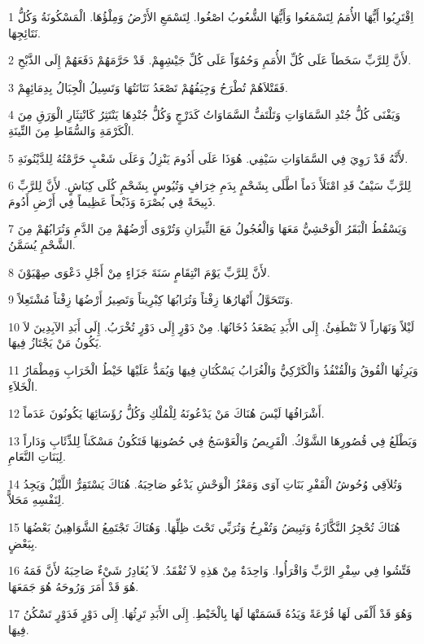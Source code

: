 \par 1 اِقْتَرِبُوا أَيُّهَا الأُمَمُ لِتَسْمَعُوا وَأَيُّهَا الشُّعُوبُ اصْغُوا. لِتَسْمَعِ الأَرْضُ وَمِلْؤُهَا. الْمَسْكُونَةُ وَكُلُّ نَتَائِجِهَا.
\par 2 لأَنَّ لِلرَّبِّ سَخَطاً عَلَى كُلِّ الأُمَمِ وَحُمُوّاً عَلَى كُلِّ جَيْشِهِمْ. قَدْ حَرَّمَهُمْ دَفَعَهُمْ إِلَى الذَّبْحِ.
\par 3 فَقَتْلاَهُمْ تُطْرَحُ وَجِيَفُهُمْ تَصْعَدُ نَتَانَتُهَا وَتَسِيلُ الْجِبَالُ بِدِمَائِهِمْ.
\par 4 وَيَفْنَى كُلُّ جُنْدِ السَّمَاوَاتِ وَتَلْتَفُّ السَّمَاوَاتُ كَدَرْجٍ وَكُلُّ جُنْدِهَا يَنْتَثِرُ كَانْتِثَارِ الْوَرَقِ مِنَ الْكَرْمَةِ وَالسُّقَاطِ مِنَ التِّينَةِ.
\par 5 لأَنَّهُ قَدْ رَوِيَ فِي السَّمَاوَاتِ سَيْفِي. هُوَذَا عَلَى أَدُومَ يَنْزِلُ وَعَلَى شَعْبٍ حَرَّمْتُهُ لِلدَّيْنُونَةِ.
\par 6 لِلرَّبِّ سَيْفٌ قَدِ امْتَلَأَ دَماً اطَّلَى بِشَحْمٍ بِدَمِ خِرَافٍ وَتُيُوسٍ بِشَحْمِ كُلَى كِبَاشٍ. لأَنَّ لِلرَّبِّ ذَبِيحَةً فِي بُصْرَةَ وَذَبْحاً عَظِيماً فِي أَرْضِ أَدُومَ.
\par 7 وَيَسْقُطُ الْبَقَرُ الْوَحْشِيُّ مَعَهَا وَالْعُجُولُ مَعَ الثِّيرَانِ وَتُرْوَى أَرْضُهُمْ مِنَ الدَّمِ وَتُرَابُهُمْ مِنَ الشَّحْمِ يُسَمَّنُ.
\par 8 لأَنَّ لِلرَّبِّ يَوْمَ انْتِقَامٍ سَنَةَ جَزَاءٍ مِنْ أَجْلِ دَعْوَى صِهْيَوْنَ.
\par 9 وَتَتَحَوَّلُ أَنْهَارُهَا زِفْتاً وَتُرَابُهَا كِبْرِيتاً وَتَصِيرُ أَرْضُهَا زِفْتاً مُشْتَعِلاً.
\par 10 لَيْلاً وَنَهَاراً لاَ تَنْطَفِئُ. إِلَى الأَبَدِ يَصْعَدُ دُخَانُهَا. مِنْ دَوْرٍ إِلَى دَوْرٍ تُخْرَبُ. إِلَى أَبَدِ الآبِدِينَ لاَ يَكُونُ مَنْ يَجْتَازُ فِيهَا.
\par 11 وَيَرِثُهَا الْقُوقُ وَالْقُنْفُذُ وَالْكَرْكِيُّ وَالْغُرَابُ يَسْكُنَانِ فِيهَا وَيُمَدُّ عَلَيْهَا خَيْطُ الْخَرَابِ وَمِطْمَارُ الْخَلاَءِ.
\par 12 أَشْرَافُهَا لَيْسَ هُنَاكَ مَنْ يَدْعُونَهُ لِلْمُلْكِ وَكُلُّ رُؤَسَائِهَا يَكُونُونَ عَدَماً.
\par 13 وَيَطْلَعُ فِي قُصُورِهَا الشَّوْكُ. الْقَرِيصُ وَالْعَوْسَجُ فِي حُصُونِهَا فَتَكُونُ مَسْكَناً لِلذِّئَابِ وَدَاراً لِبَنَاتِ النَّعَامِ.
\par 14 وَتُلاَقِي وُحُوشُ الْقَفْرِ بَنَاتِ آوَى وَمَعْزُ الْوَحْشِ يَدْعُو صَاحِبَهُ. هُنَاكَ يَسْتَقِرُّ اللَّيْلُ وَيَجِدُ لِنَفْسِهِ مَحَلاًّ.
\par 15 هُنَاكَ تُحْجِرُ النَّكَّازَةُ وَتَبِيضُ وَتُفْرِخُ وَتُرَبِّي تَحْتَ ظِلِّهَا. وَهُنَاكَ تَجْتَمِعُ الشَّوَاهِينُ بَعْضُهَا بِبَعْضٍ.
\par 16 فَتِّشُوا فِي سِفْرِ الرَّبِّ وَاقْرَأُوا. وَاحِدَةٌ مِنْ هَذِهِ لاَ تُفْقَدُ. لاَ يُغَادِرُ شَيْءٌ صَاحِبَهُ لأَنَّ فَمَهُ هُوَ قَدْ أَمَرَ وَرُوحَهُ هُوَ جَمَعَهَا.
\par 17 وَهُوَ قَدْ أَلْقَى لَهَا قُرْعَةً وَيَدُهُ قَسَمَتْهَا لَهَا بِالْخَيْطِ. إِلَى الأَبَدِ تَرِثُهَا. إِلَى دَوْرٍ فَدَوْرٍ تَسْكُنُ فِيهَا.


